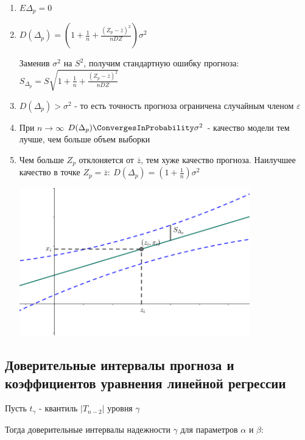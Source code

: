 \documentclass[12pt]{article}
\begin{document}
\begin{enumerate}
    \item $E \Delta_p = 0$
    \item $D (\Delta_p) = \left(1 + \frac{1}{n} + \frac{(Z_p - \overline{z})^2}{n DZ}\right) \sigma^2$

    Заменив $\sigma^2$ на $S^2$, получим стандартную ошибку прогноза: $S_{\Delta_p} = S \sqrt{1 + \frac{1}{n} + \frac{(Z_p - \overline{z})^2}{n DZ}}$

    \item $D(\Delta_p) > \sigma^2$ - то есть точность прогноза ограничена случайным членом $\varepsilon$

    \item При $n \to \infty$ $D(\Delta_p) \ConvergesInProbability \sigma^2$ - качество модели тем лучше, чем больше объем выборки

    \item Чем больше $Z_p$ отклоняется от $\overline{z}$, тем хуже качество прогноза. Наилучшее качество в точке $Z_p = \overline{z}: \ D(\Delta_p) = \left(1 + \frac{1}{n}\right) \sigma^2$


    \begin{center}
        \includegraphics[width=10cm]{mathstat/images/mathstat_2025_04_15_1}
    \end{center}
\end{enumerate}

\subsection{Доверительные интервалы прогноза и коэффициентов уравнения линейной регрессии}

Пусть $t_\gamma$ - квантиль $|T_{n - 2}|$ уровня $\gamma$

Тогда доверительные интервалы надежности $\gamma$ для параметров $\alpha$ и $\beta$:
\end{document}

